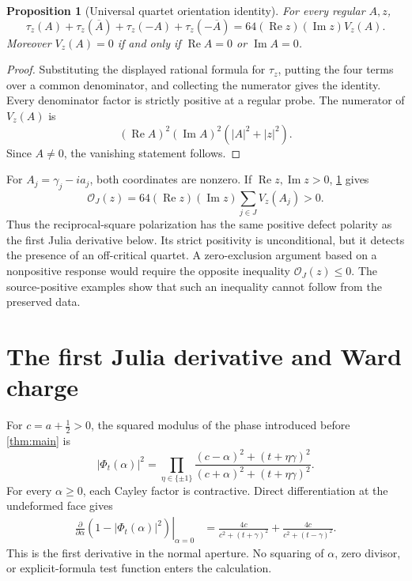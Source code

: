\documentclass[11pt]{article}
\newtheorem{proposition}[theorem]{Proposition}
\newcommand{\OO}{\mathcal O}
\newcommand{\re}{\operatorname{Re}}
\newcommand{\im}{\operatorname{Im}}
\begin{document}
\begin{proposition}[Universal quartet orientation identity]
\label{prop:orientation}
For every regular \(A,z\),
\[
 \tau_z(A)+\tau_z(\overline A)+\tau_z(-A)+\tau_z(-\overline A)
 =64(\re z)(\im z)V_z(A).
\]
Moreover \(V_z(A)=0\) if and only if
\(\re A=0\) or \(\im A=0\).
\end{proposition}

\begin{proof}
Substituting the displayed rational formula for \(\tau_z\), putting the
four terms over a common denominator, and collecting the numerator gives
the identity.  Every denominator factor is strictly positive at a regular
probe.  The numerator of \(V_z(A)\) is
\[
 (\re A)^2(\im A)^2(|A|^2+|z|^2).
\]
Since \(A\neq0\), the vanishing statement follows.
\end{proof}

For \(A_j=\gamma_j-ia_j\), both coordinates are nonzero.  If
\(\re z,\im z>0\), \cref{prop:orientation} gives
\[
 \OO_J(z)
 =64(\re z)(\im z)\sum_{j\in J}V_z(A_j)>0.
\]
Thus the reciprocal-square polarization has the same positive defect
polarity as the first Julia derivative below.  Its strict positivity is
unconditional, but it detects the presence of an off-critical quartet.
A zero-exclusion argument based on a nonpositive response would require
the opposite inequality \(\OO_J(z)\leq0\).  The source-positive examples
show that such an inequality cannot follow from the preserved data.

\section{The first Julia derivative and Ward charge}
\label{sec:ward}

For \(c=a+\frac12>0\), the squared modulus of the phase introduced before
\cref{thm:main} is
\[
 |\Phi_t(\alpha)|^2
 =\prod_{\eta\in\{\pm1\}}
 \frac{(c-\alpha)^2+(t+\eta\gamma)^2}
      {(c+\alpha)^2+(t+\eta\gamma)^2}.
\]
For every \(\alpha\geq0\), each Cayley factor is contractive.  Direct
differentiation at the undeformed face gives
\[
\begin{aligned}
\left.\frac{\partial}{\partial\alpha}
 (1-|\Phi_t(\alpha)|^2)\right|_{\alpha=0}
 &=
 \frac{4c}{c^2+(t+\gamma)^2}
 +\frac{4c}{c^2+(t-\gamma)^2}.
\end{aligned}
\]
This is the first derivative in the normal aperture.  No squaring of
\(\alpha\), zero divisor, or explicit-formula test function enters the
calculation.
\end{document}
